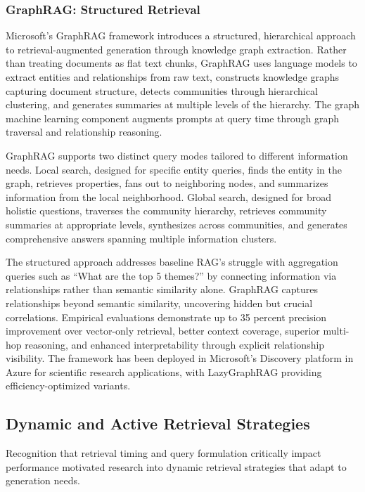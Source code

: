 \documentclass[11pt,letterpaper]{article}
\begin{document}
\subsubsection{GraphRAG: Structured Retrieval}

Microsoft's GraphRAG framework introduces a structured, hierarchical approach to retrieval-augmented generation through knowledge graph extraction. Rather than treating documents as flat text chunks, GraphRAG uses language models to extract entities and relationships from raw text, constructs knowledge graphs capturing document structure, detects communities through hierarchical clustering, and generates summaries at multiple levels of the hierarchy. The graph machine learning component augments prompts at query time through graph traversal and relationship reasoning.

GraphRAG supports two distinct query modes tailored to different information needs. Local search, designed for specific entity queries, finds the entity in the graph, retrieves properties, fans out to neighboring nodes, and summarizes information from the local neighborhood. Global search, designed for broad holistic questions, traverses the community hierarchy, retrieves community summaries at appropriate levels, synthesizes across communities, and generates comprehensive answers spanning multiple information clusters.

The structured approach addresses baseline RAG's struggle with aggregation queries such as ``What are the top 5 themes?'' by connecting information via relationships rather than semantic similarity alone. GraphRAG captures relationships beyond semantic similarity, uncovering hidden but crucial correlations. Empirical evaluations demonstrate up to 35 percent precision improvement over vector-only retrieval, better context coverage, superior multi-hop reasoning, and enhanced interpretability through explicit relationship visibility. The framework has been deployed in Microsoft's Discovery platform in Azure for scientific research applications, with LazyGraphRAG providing efficiency-optimized variants.

\subsection{Dynamic and Active Retrieval Strategies}

Recognition that retrieval timing and query formulation critically impact performance motivated research into dynamic retrieval strategies that adapt to generation needs.
\end{document}
